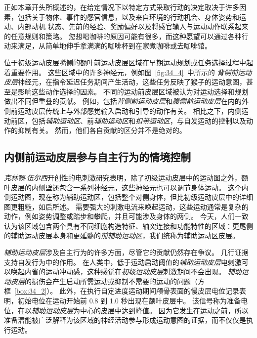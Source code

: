 正如本章开头所概述的，在给定情况下以特定方式采取行动的决定取决于许多因素，包括关于物体、事件的感官信息，以及来自环境的行动机会、身体姿势和运动、内部动机 状态、先前的经验、奖励偏好以及将感官输入与运动动作联系起来的任意规则和策略。
您想喝咖啡的原因可能有很多，而这种愿望可以通过各种行动来满足，从简单地伸手拿满满的咖啡杯到在家煮咖啡或去咖啡馆。


位于初级运动皮层嘴侧的额叶前运动皮层区域在早期运动规划或任务选择过程中起着重要作用。
这些区域中的许多神经元，例如图~\ref{fig:34_4}~中所示的 \textit{背侧前运动皮层}神经元，在指令延迟任务期间产生活动，这些任务反映了猴子的运动意图，甚至是影响这些动作选择的因素。
不同的运动前皮层区域被认为对运动选择和规划做出不同但重叠的贡献。
例如，包括\textit{背侧前运动皮层}和\textit{腹侧前运动皮层}在内的外侧前运动皮层传统上与外部感觉输入启动和引导的动作有关。
相比之下，内侧运动前区，包括\textit{辅助运动区}、前\textit{辅助运动区}和\textit{扣带运动区}，与自发运动的控制以及动作的抑制有关。
然而，他们各自贡献的区分并不是绝对的。



\subsection{内侧前运动皮层参与自主行为的情境控制}

\textit{克林顿$\cdot$伍尔西}开创性的电刺激研究表明，除了初级运动皮层中的运动图之外，额叶皮层的内侧壁还包含一系列神经元，这些神经元也可以调节身体运动。
这个内侧运动图，现在称为辅助运动区，包括整个对侧身体，但比初级运动皮层中的详细图更粗糙，如后所述。
需要强大的刺激电流来唤起运动，这些运动通常是复杂的动作，例如姿势调整或踏步和攀爬，并且可能涉及身体的两侧。
今天，人们一致认为该区域包含两个具有不同细胞构造特征、轴突连接和功能特性的区域：更尾侧的辅助运动皮层本身和更延髓的\textit{前辅助运动区}，我们统称为辅助运动区皮层。


\textit{辅助运动皮层}涉及自主行为的许多方面，尽管它的贡献仍然存在争议。
几行证据支持自发行为中的作用。
在人类中，低于运动启动阈值的\textit{辅助运动皮层}电刺激可以唤起内省的运动冲动感，这种感觉在\textit{初级运动皮层}刺激期间不会出现。
\textit{辅助运动皮层}的损伤会产生启动所需运动或抑制不需要的运动的问题（方框~\ref{box:34_2}）。
此外，在执行自定进度运动期间颅骨表面的慢皮层电位记录表明，初始电位在运动开始前 0.8 到 1.0 秒出现在额叶皮层中。
该信号称为准备电位，在以\textit{辅助运动皮层}为中心的皮层中达到峰值。
因为它发生在运动之前，所以准备潜能被广泛解释为该区域的神经活动参与形成运动意图的证据，而不仅仅是执行运动。



